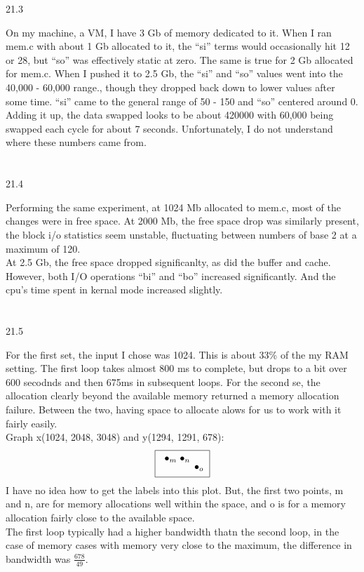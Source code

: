 \documentclass[12pt, a4paper]{article}
\begin{document}
	21.3
	
		On my machine, a VM, I have 3 Gb of memory dedicated to it. 
		When I ran mem.c with about 1 Gb allocated to it, the ``si'' terms would occasionally hit 12 or 28, but ``so'' was effectively static at zero. The same is true for 2 Gb allocated for mem.c. When I pushed it to 2.5 Gb, the ``si'' and ``so'' values went into the 40,000 - 60,000 range., though they dropped back down to lower values after some time. ``si'' came to the general range of 50 - 150 and ``so'' centered around 0.
		Adding it up, the data swapped looks to be about 420000 with 60,000 being swapped each cycle for about 7 seconds. Unfortunately, I do not understand where these numbers came from. \\ \\ \\
	
	21.4
	
		Performing the same experiment, at 1024 Mb allocated to mem.c, most of the changes were in free space. At 2000 Mb, the free space drop was similarly present, the block i/o statistics seem unstable, fluctuating between numbers of base 2 at a maximum of 120. \\
		At 2.5 Gb, the free space dropped significanlty, as did the buffer and cache. However, both I/O operations ``bi'' and ``bo'' increased significantly. And the cpu's time spent in kernal mode increased slightly.  \\ \\ \\

	21.5
	
		For the first set, the input I chose was 1024. This is about 33\% of the my RAM setting. The first loop takes almost 800 ms to complete, but drops to a bit over 600 secodnds and then 675ms in subsequent loops.
		For the second se, the allocation clearly beyond the available memory returned a memory allocation failure. Between the two, having space to allocate alows for us to work with it fairly easily.\\
		Graph x(1024, 2048, 3048) and y(1294, 1291, 678):\\
		\[ \fbox{ \xygraph{  
		!{<0cm,0cm>;<0.5cm,0cm>:<0cm,0.5cm>::} 
		!{(1.024,1.294) }*+{\bullet_{m}}  
		!{(2.048,1.291) }*+{\bullet_{n}}  
		!{(3.048,0.678) }*+{\bullet_{o}}  
		} } \] 
		I have no idea how to get the labels into this plot. But, the first two points, m and n, are for memory allocations well within the space, and o is for a memory allocation fairly close to the available space.\\
		The first loop typically had a higher bandwidth thatn the second loop,
	 in the case of  memory cases with memory very close to the maximum, the difference in bandwidth was \(\frac{678}{49}\). \\ \\ \\
	
\end{document}
